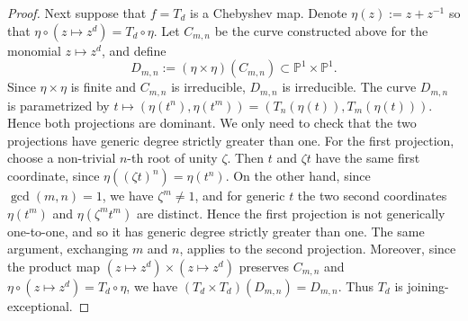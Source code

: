 \documentclass[11pt]{amsart}
\numberwithin{equation}{section}
\theoremstyle{plain}
\theoremstyle{definition}
\theoremstyle{remark}
\begin{document}
\begin{proof}
Next suppose that $f=T_d$ is a Chebyshev map. Denote
$\eta(z):=z+z^{-1}$ so that
$\eta\circ (z\mapsto z^d)=T_d\circ\eta$. Let $C_{m,n}$ be the curve
constructed above for the monomial $z\mapsto z^d$, and define
$$
D_{m,n}:=(\eta\times\eta)(C_{m,n})\subset\mathbb P^1\times\mathbb P^1.
$$
Since $\eta\times\eta$ is finite and $C_{m,n}$ is irreducible,
$D_{m,n}$ is irreducible. The curve $D_{m,n}$ is parametrized by
$t\mapsto(\eta(t^n),\eta(t^m))=(T_n(\eta(t)),T_m(\eta(t)))$. Hence both
projections are dominant. We only need to check that the two projections
have generic degree strictly greater than one. For the first projection,
choose a non-trivial $n$-th root of unity $\zeta$. Then $t$ and
$\zeta t$ have the same first coordinate, since
$\eta((\zeta t)^n)=\eta(t^n)$. On the other hand, since
$\gcd(m,n)=1$, we have $\zeta^m\neq1$, and for generic $t$ the two
second coordinates $\eta(t^m)$ and $\eta(\zeta^m t^m)$ are distinct.
Hence the first projection is not generically one-to-one, and so it has
generic degree strictly greater than one. The same argument, exchanging
$m$ and $n$, applies to the second projection. Moreover, since
the product map
$(z\mapsto z^d)\times(z\mapsto z^d)$ preserves $C_{m,n}$ and
$\eta\circ(z\mapsto z^d)=T_d\circ\eta$, we have
$(T_d\times T_d)(D_{m,n})=D_{m,n}$. Thus $T_d$ is joining-exceptional.

\smallskip


\end{proof}
\end{document}
